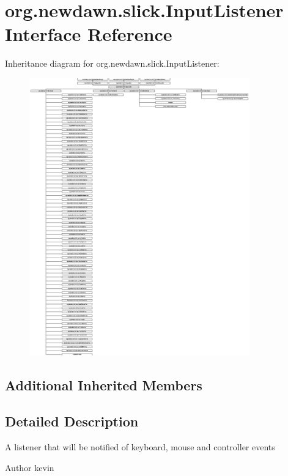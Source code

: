 \hypertarget{interfaceorg_1_1newdawn_1_1slick_1_1_input_listener}{}\section{org.\+newdawn.\+slick.\+Input\+Listener Interface Reference}
\label{interfaceorg_1_1newdawn_1_1slick_1_1_input_listener}
Inheritance diagram for org.\+newdawn.\+slick.\+Input\+Listener\+:\begin{figure}[H]
\begin{center}
\leavevmode
\includegraphics[height=12.000000cm]{interfaceorg_1_1newdawn_1_1slick_1_1_input_listener}
\end{center}
\end{figure}
\subsection*{Additional Inherited Members}


\subsection{Detailed Description}
A listener that will be notified of keyboard, mouse and controller events

\begin{DoxyAuthor}{Author}
kevin 
\end{DoxyAuthor}
